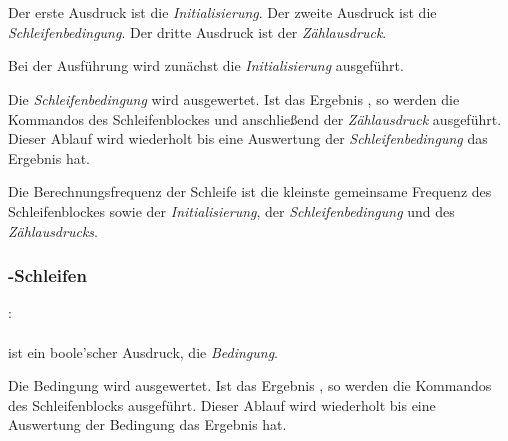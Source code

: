 \hspace*{1cm}\glq{}\grq  \glq\Gt{(}\grq {}  \glq\Gt{;}\grq {}  \glq\Gt{;}\grq  \glq\Gt{)}\grq  \glq\Gt{\{}\grq  {}  \glq\Gt{\}}\grq \\
\hspace*{1cm}\glq{}\grq  \glq\Gt{(}\grq {}  \glq\Gt{;}\grq {}  \glq\Gt{;}\grq {}  \glq\Gt{)}\grq  \glq\Gt{\{}\grq  {}  \glq\Gt{\}}\grq \\

Der erste Ausdruck ist die \emph{Initialisierung}. Der zweite Ausdruck ist die \emph{Schleifenbedingung}. Der dritte Ausdruck ist der \emph{Zählausdruck}.

Bei der Ausführung wird zunächst die \emph{Initialisierung} ausgeführt.

Die \emph{Schleifenbedingung} wird ausgewertet. Ist das Ergebnis , so werden die Kommandos des Schleifenblockes
und anschließend der \emph{Zählausdruck} ausgeführt.
Dieser Ablauf wird wiederholt bis eine Auswertung der \emph{Schleifenbedingung} das Ergebnis  hat.

Die Berechnungsfrequenz der Schleife ist die kleinste gemeinsame Frequenz des Schleifenblockes sowie
der \emph{Initialisierung}, der \emph{Schleifenbedingung} und des \emph{Zählausdrucks}.

\subsubsection{-Schleifen}\label{$_backslash$kw__while__-Schleifen}
:\label{schleife_while}\\
\hspace*{1cm}\glq{}\grq  \glq\Gt{(}\grq  {}  \glq\Gt{)}\grq  \glq\Gt{\{}\grq  {}  \glq\Gt{\}}\grq \\

\glq{}\grq ist ein boole'scher Ausdruck, die \emph{Bedingung}.

Die Bedingung wird ausgewertet. Ist das Ergebnis , so werden die Kommandos des Schleifenblocks
ausgeführt. Dieser Ablauf wird wiederholt bis eine Auswertung der Bedingung das Ergebnis  hat.

